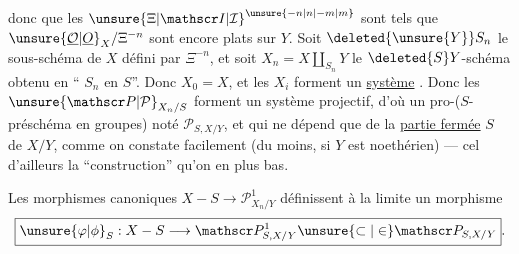 donc    {} que les ${\unsure{\Xi|\mathscr I|\mathcal I}}^{{\unsure{-n|n|-m|m}}}$ sont tels que ${\unsure{\underline{\mathcal O}|\underline O}}_X/\Xi^{-n}$ sont encore plats sur $Y$. Soit $\deleted{{\unsure{Y}}}S_n$ le sous-schéma de $X$ défini par $\Xi^{-n}$, et soit $X_n=X\amalg_{S_n}Y$ le $\deleted{S}Y$-schéma obtenu en ``{} $S_n$ en $S$''.
  Donc $X_0=X$, et les $X_i$ forment un \uline{système} \uline{}.
Donc les ${\unsure{\mathscr P|\mathcal P}}_{X_n/S}$ forment un système  projectif, d’où un pro-($S$-préschéma en groupes) noté $\mathscr P_{S,X/Y}$, et qui ne dépend que de la \uline{partie fermée} $S$ de $X/Y$, comme on constate facilement (du moins, si $Y$ est noethérien) --- cel{} {} d’ailleurs {} la ``construction'' qu’on en {} plus bas.

Les morphismes canoniques $X-S\longrightarrow\mathscr P^1_{X_n/Y}$ définissent à la limite un morphisme
\[
\boxed{{\unsure{\varphi|\phi}}_S:X-S\longrightarrow\mathscr P^1_{S,X/Y}{\unsure{\subset|\in}}\mathscr P_{S,X/Y}}.
\]
